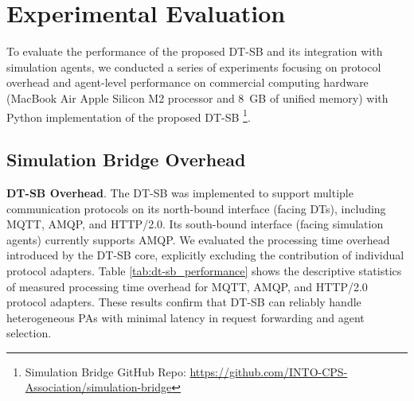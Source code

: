 \section{Experimental Evaluation}
\label{sec:experimental_evaluation}

To evaluate the performance of the proposed DT-SB and its integration with simulation agents, we conducted a series of experiments focusing on protocol overhead and agent-level performance on commercial computing hardware (MacBook Air Apple Silicon M2 processor and 8~GB of unified memory) with Python implementation of the proposed DT-SB \footnote{Simulation Bridge GitHub Repo: \url{https://github.com/INTO-CPS-Association/simulation-bridge}}. 


\subsection{Simulation Bridge Overhead}

\textbf{DT-SB Overhead}. The DT-SB was implemented to support multiple communication protocols on its north-bound interface (facing DTs), including MQTT, AMQP, and HTTP/2.0. Its south-bound interface (facing simulation agents) currently supports AMQP. We evaluated the processing time overhead introduced by the DT-SB core, explicitly excluding the contribution of individual protocol adapters.
Table \ref{tab:dt-sb_performance} shows the descriptive statistics of measured processing time overhead for MQTT, AMQP, and HTTP/2.0 protocol adapters.
These results confirm that DT-SB can reliably handle heterogeneous PAs with minimal latency in request forwarding and agent selection.

